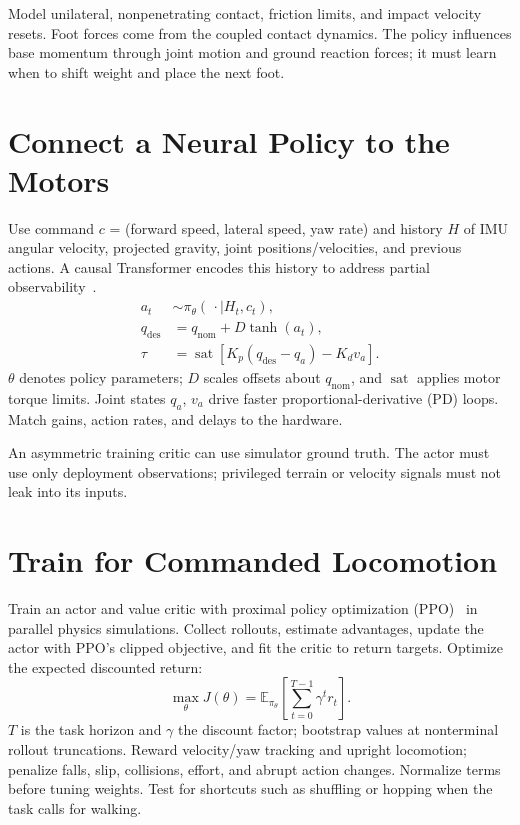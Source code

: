 Model unilateral, nonpenetrating contact, friction limits, and impact
velocity resets. Foot forces come from the coupled contact dynamics. The
policy influences base momentum through joint motion and ground reaction
forces; it must learn when to shift weight and place the next foot.

\section{Connect a Neural Policy to the Motors}
Use command $c$ = (forward speed, lateral speed, yaw rate)
and history $H$ of IMU angular velocity, projected gravity, joint
positions/velocities, and previous actions. A causal Transformer encodes
this history to address partial observability~\cite{radosavovic2024}.
\begin{equation}
\begin{aligned}
a_t&\sim\pi_\theta(\,\cdot\mid H_t,c_t),\\
q_{\mathrm{des}}&=q_{\mathrm{nom}}+D\tanh(a_t),\\
\tau&=\operatorname{sat}[K_p(q_{\mathrm{des}}-q_a)-K_dv_a].
\end{aligned}
\end{equation}
$\theta$ denotes policy parameters; $D$ scales offsets about
$q_{\mathrm{nom}}$, and $\operatorname{sat}$ applies motor torque limits.
Joint states $q_a$, $v_a$ drive faster proportional-derivative (PD) loops.
Match gains, action rates, and delays to the hardware.

An asymmetric training critic can use simulator ground truth. The actor
must use only deployment observations; privileged terrain or velocity
signals must not leak into its inputs.

\section{Train for Commanded Locomotion}
Train an actor and value critic with proximal policy optimization
(PPO)~\cite{schulman2017} in parallel physics simulations. Collect rollouts,
estimate advantages, update the actor with PPO's clipped objective, and
fit the critic to return targets. Optimize the expected discounted return:
\begin{equation}
\max_\theta J(\theta)=\mathbb E_{\pi_\theta}
\left[\sum_{t=0}^{T-1}\gamma^t r_t\right].
\end{equation}
$T$ is the task horizon and $\gamma$ the discount factor; bootstrap values
at nonterminal rollout truncations. Reward velocity/yaw tracking and
upright locomotion; penalize falls, slip, collisions, effort, and abrupt
action changes. Normalize terms before tuning weights. Test for shortcuts
such as shuffling or hopping when the task calls for walking.

